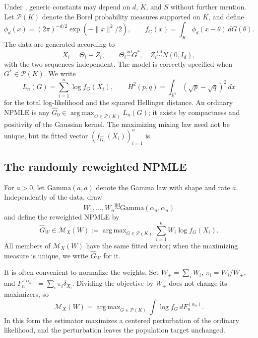 \documentclass[11pt]{article}
\theoremstyle{definition}
\theoremstyle{remark}
\DeclareMathOperator*{\argmax}{arg\,max}
\newcommand{\Pcal}{\mathcal P}
\newcommand{\Mcal}{\mathcal M}
\newcommand{\RR}{\mathbb R}
\newcommand{\norm}[1]{\lVert #1\rVert}
\newcommand{\Ghat}{\widehat G}
\begin{document}
\noindent
Under , generic constants may depend on $d$, $K$, and
$S$ without further mention.  Let $\Pcal(K)$ denote the Borel
probability measures supported on $K$, and define
\[
 \phi_d(x)=(2\pi)^{-d/2}\exp(-\norm{x}^2/2),
 \qquad f_G(x)=\int_K\phi_d(x-\theta)\,dG(\theta).
\]
The data are generated according to
\begin{equation}\label{eq:model}
 X_i=\Theta_i+Z_i,\qquad
 \Theta_i\stackrel{\mathrm{iid}}\sim G^*,\quad
 Z_i\stackrel{\mathrm{iid}}\sim N(0,I_d),
\end{equation}
with the two sequences independent.  The model is correctly specified when
$G^*\in\Pcal(K)$.  We write
\[
 L_n(G)=\sum_{i=1}^n\log f_G(X_i),
 \qquad
 H^2(p,q)=\int_{\RR^d}(\sqrt p-\sqrt q)^2\,dx
\]
for the total log-likelihood and the squared Hellinger distance.  An
ordinary NPMLE is any $\Ghat_0\in\argmax_{G\in\Pcal(K)}L_n(G)$; it exists by
compactness and positivity of the Gaussian kernel.  The maximizing mixing law
need not be unique, but its fitted vector $(f_{\Ghat_0}(X_i))_{i=1}^n$ is.

\subsection{The randomly reweighted NPMLE}

For $a>0$, let $\mathrm{Gamma}(a,a)$ denote the Gamma law with shape and
rate $a$.  Independently of the data, draw
\begin{equation}\label{eq:weights}
 W_1,\ldots,W_n\stackrel{\mathrm{iid}}\sim\mathrm{Gamma}(\alpha_n,\alpha_n)
\end{equation}
and define the reweighted NPMLE by
\begin{equation}\label{eq:rrnpmle}
 \Ghat_W\in\Mcal_X(W):=
 \argmax_{G\in\Pcal(K)}\sum_{i=1}^nW_i\log f_G(X_i).
\end{equation}
All members of $\Mcal_X(W)$ have the same fitted vector; when the maximizing
measure is unique, we write $\Ghat_W$ for it.

It is often convenient to normalize the weights.  Set $W_+=\sum_iW_i$,
$\pi_i=W_i/W_+$, and $F_n^{(\alpha_n)}=\sum_i\pi_i\delta_{X_i}$.  Dividing the
objective by $W_+$ does not change its maximizers, so
\[
 \Mcal_X(W)=\argmax_{G\in\Pcal(K)}
 \int\log f_G\,dF_n^{(\alpha_n)}.
\]
In this form the estimator maximizes a centered perturbation of the ordinary
likelihood, and the perturbation leaves the population target unchanged.
\end{document}

